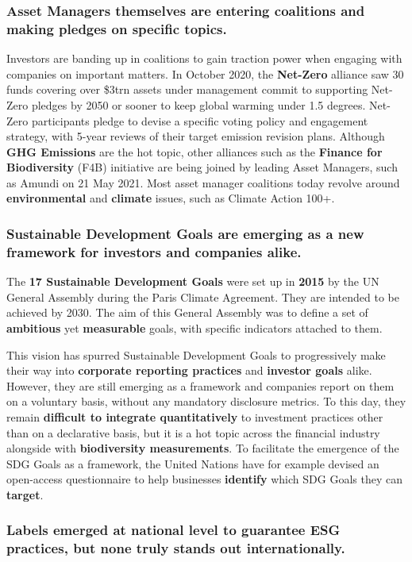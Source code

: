 \documentclass[12pt]{report}
\begin{document}
\subsubsection{Asset Managers themselves are entering coalitions and making pledges on specific topics.}

Investors are banding up in coalitions to gain traction power when engaging with companies on important matters. In October 2020, the \textbf{Net-Zero} alliance saw 30 funds covering over \$3trn assets under management commit to supporting Net-Zero pledges by 2050 or sooner to keep global warming under 1.5 degrees. Net-Zero participants pledge to devise a specific voting policy and engagement strategy, with 5-year reviews of their target emission revision plans. Although \textbf{GHG Emissions} are the hot topic, other alliances such as the \textbf{Finance for Biodiversity} (F4B) initiative are being joined by leading Asset Managers, such as Amundi on 21 May 2021. Most asset manager coalitions today revolve around \textbf{environmental} and \textbf{climate} issues, such as Climate Action 100+. 

\subsubsection{Sustainable Development Goals are emerging as a new framework for investors and companies alike. }
The \textbf{17 Sustainable Development Goals} were set up in \textbf{2015} by the UN General Assembly during the Paris Climate Agreement. They are intended to be achieved by 2030. The aim of this General Assembly was to define a set of \textbf{ambitious} yet \textbf{measurable} goals, with specific indicators attached to them. 


This vision has spurred Sustainable Development Goals to progressively make their way into \textbf{corporate reporting practices} and \textbf{investor goals} alike. However, they are still emerging as a framework and companies report on them on a voluntary basis, without any mandatory disclosure metrics. To this day, they remain \textbf{difficult to integrate quantitatively} to investment practices other than on a declarative basis, but it is a hot topic across the financial industry alongside with \textbf{biodiversity measurements}. To facilitate the emergence of the SDG Goals as a framework, the United Nations have for example devised an open-access questionnaire to help businesses \textbf{identify} which SDG Goals they can \textbf{target}. 

\subsubsection{Labels emerged at national level to guarantee ESG practices, but none truly stands out internationally.}
\end{document}
